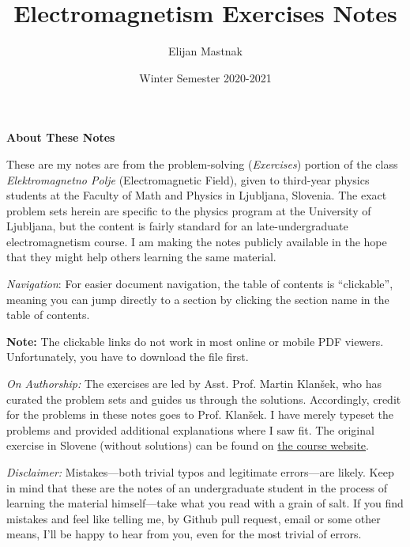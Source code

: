 \documentclass[11pt, a4paper]{article}
\begin{document}
\title{Electromagnetism Exercises Notes}
\author{Elijan Mastnak}
\date{Winter Semester 2020-2021}
\maketitle


\begin{center}
\textbf{About These Notes}
\end{center}
These are my notes are from the problem-solving (\textit{Exercises}) portion of the class \textit{Elektromagnetno Polje} (Electromagnetic Field), given to third-year physics students at the Faculty of Math and Physics in Ljubljana, Slovenia. The exact problem sets herein are specific to the physics program at the University of Ljubljana, but the content is fairly standard for an late-undergraduate electromagnetism course. I am making the notes publicly available in the hope that they might help others learning the same material.

\vspace{2mm}
\textit{Navigation}: For easier document navigation, the table of contents is ``clickable'', meaning you can jump directly to a section by clicking the section name in the table of contents. 

\textbf{Note:} The clickable links do not work in most online or mobile PDF viewers. Unfortunately, you have to download the file first.

\vspace{2mm}
\textit{On Authorship:} 
The exercises are led by Asst. Prof. Martin Klan\v{s}ek, who has curated the problem sets and guides us through the solutions. Accordingly, credit for the problems in these notes goes to Prof. Klan\v{s}ek. I have merely typeset the problems and provided additional explanations where I saw fit. The original exercise in Slovene (without solutions) can be found on \href{https://www-f5.ijs.si/emp-2020-2021.html}{the course website}. 

\vspace{2mm}
\textit{Disclaimer:} Mistakes---both trivial typos and legitimate errors---are likely. Keep in mind that these are the notes of an undergraduate student in the process of learning the material himself---take what you read with a grain of salt. If you find mistakes and feel like telling me, by Github pull request, email or some other means, I'll be happy to hear from you, even for the most trivial of errors.
\end{document}
